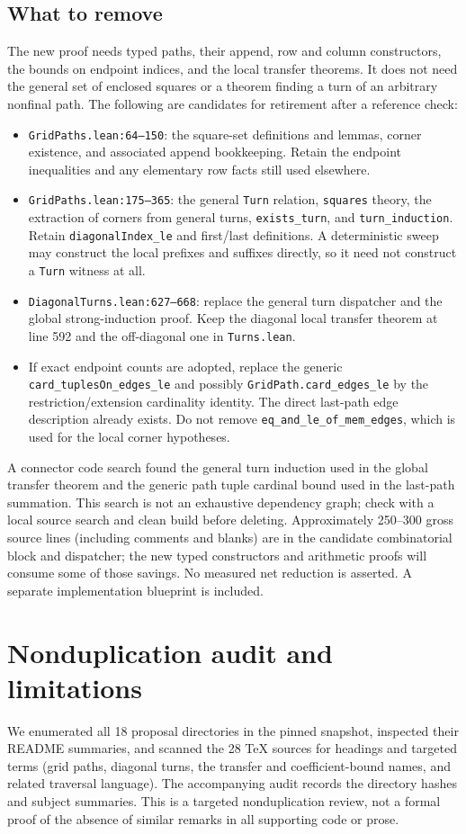 \documentclass[11pt]{article}
\newcommand{\code}[1]{\texttt{#1}}
\begin{document}
\subsection{What to remove}
The new proof needs typed paths, their append, row and column constructors, the bounds on endpoint indices, and the local transfer theorems. It does not need the general set of enclosed squares or a theorem finding a turn of an arbitrary nonfinal path. The following are candidates for retirement after a reference check:
\begin{itemize}
\item \texttt{GridPaths.lean:64--150}: the square-set definitions and lemmas, corner existence, and associated append bookkeeping. Retain the endpoint inequalities and any elementary row facts still used elsewhere.
\item \texttt{GridPaths.lean:175--365}: the general \code{Turn} relation, \code{squares} theory, the extraction of corners from general turns, \code{exists\_turn}, and \code{turn\_induction}. Retain \code{diagonalIndex\_le} and first/last definitions. A deterministic sweep may construct the local prefixes and suffixes directly, so it need not construct a \code{Turn} witness at all.
\item \texttt{DiagonalTurns.lean:627--668}: replace the general turn dispatcher and the global strong-induction proof. Keep the diagonal local transfer theorem at line 592 and the off-diagonal one in \texttt{Turns.lean}.
\item If exact endpoint counts are adopted, replace the generic \code{card\_tuplesOn\_edges\_le} and possibly \code{GridPath.card\_edges\_le} by the restriction/extension cardinality identity. The direct last-path edge description already exists. Do not remove \code{eq\_and\_le\_of\_mem\_edges}, which is used for the local corner hypotheses.
\end{itemize}
A connector code search found the general turn induction used in the global transfer theorem and the generic path tuple cardinal bound used in the last-path summation. This search is not an exhaustive dependency graph; check with a local source search and clean build before deleting. Approximately 250--300 gross source lines (including comments and blanks) are in the candidate combinatorial block and dispatcher; the new typed constructors and arithmetic proofs will consume some of those savings. No measured net reduction is asserted. A separate implementation blueprint is included.

\section{Nonduplication audit and limitations}
We enumerated all 18 proposal directories in the pinned snapshot, inspected their README summaries, and scanned the 28 TeX sources for headings and targeted terms (grid paths, diagonal turns, the transfer and coefficient-bound names, and related traversal language). The accompanying audit records the directory hashes and subject summaries. This is a targeted nonduplication review, not a formal proof of the absence of similar remarks in all supporting code or prose.
\end{document}
